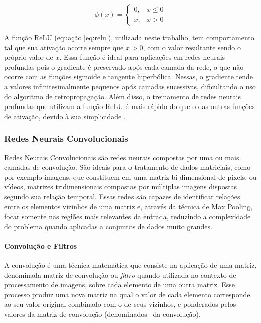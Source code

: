 \begin{equation}\label{eq:relu}
    \phi(x) = \left\{
        \begin{array}{ll}
            0, & x \le 0\\
            x, & x > 0
        \end{array}
    \right.
\end{equation}

A função ReLU (equação \ref{eq:relu}), utilizada neste trabalho, tem comportamento tal que sua ativação ocorre sempre que $x>0$, com o valor resultante sendo o próprio valor de $x$. 
Essa função é ideal para aplicações em redes neurais profundas pois o gradiente é preservado após cada camada da rede, o que não ocorre com as funções sigmoide e tangente hiperbólica.
Nessas, o gradiente tende a valores infinitesimalmente pequenos após camadas sucessivas, dificultando o uso do algoritmo de retropropagação.
Além disso, o treinamento de redes neurais profundas que utilizam a função ReLU é mais rápido do que o das outras funções de ativação, devido à sua simplicidade \cite{krizhevskyImageNetClassificationDeep2017}.

\subsubsection{Redes Neurais Convolucionais}
\label{sec:convnet}

Redes Neurais Convolucionais são redes neurais compostas por uma ou mais camadas de convolução.
São ideais para o tratamento de dados matriciais, como por exemplo imagens, que constituem em uma matriz bi-dimensional de pixels, ou vídeos, matrizes tridimensionais compostas por múltiplas imagens dispostas segundo sua relação temporal.
Essas redes são capazes de identificar relações entre os elementos vizinhos de uma matriz e, através da técnica de Max Pooling, focar somente nas regiões mais relevantes da entrada, reduzindo a complexidade do problema quando aplicadas a conjuntos de dados muito grandes.

\paragraph{Convolução e Filtros}
\label{sec:convolution}

A convolução é uma técnica matemática que consiste na aplicação de uma matriz, denominada matriz de convolução ou \textit{filtro} quando utilizada no contexto de processamento de imagens, sobre cada elemento de uma outra matriz.
Esse processo produz uma nova matriz na qual o valor de cada elemento corresponde ao seu valor original combinado com o de seus vizinhos, e ponderados pelos valores da matriz de convolução (denominados \ da convolução).

